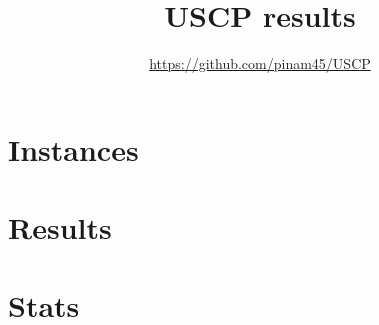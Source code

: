 \documentclass[12pt,a4paper,twoside]{article}
\title{USCP results}
\author{\url{https://github.com/pinam45/USCP}}
\date{\DTMusedate{generated} \DTMusetime{generated}}
\begin{document}
	\maketitle{}
	\tableofcontents{}
	\listoftables{}
	\newpage\section{Instances}
		
		
		
		
	\newpage\section{Results}
		
	\newpage\section{Stats}
		
\end{document}
